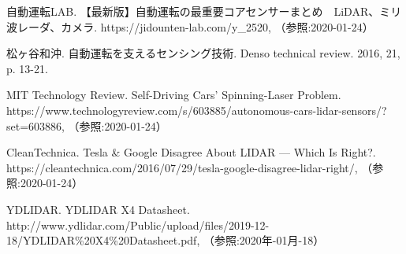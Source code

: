 {\small
\begin{thebibliography}{9}
   自動運転LAB. 【最新版】自動運転の最重要コアセンサーまとめ　LiDAR、ミリ波レーダ、カメラ. https://jidounten-lab.com/y\_2520, （参照:2020-01-24）

   松ヶ谷和沖. 自動運転を支えるセンシング技術. Denso technical review. 2016, 21, p. 13-21.

   MIT Technology Review. Self-Driving Cars’ Spinning-Laser Problem. https://www.technologyreview.com/s/603885/autonomous-cars-lidar-sensors/?set=603886, （参照:2020-01-24）

   CleanTechnica. Tesla \& Google Disagree About LIDAR — Which Is Right?. https://cleantechnica.com/2016/07/29/tesla-google-disagree-lidar-right/, （参照:2020-01-24）



   YDLIDAR. YDLIDAR X4 Datasheet. http://www.ydlidar.com/Public/upload/files/2019-12-18/YDLIDAR\%20X4\%20Datasheet.pdf, （参照:2020年-01月-18）

\end{thebibliography}
}